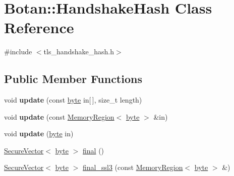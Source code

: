 \hypertarget{classBotan_1_1HandshakeHash}{\section{Botan\-:\-:Handshake\-Hash Class Reference}
\label{classBotan_1_1HandshakeHash}
}


{\ttfamily \#include $<$tls\-\_\-handshake\-\_\-hash.\-h$>$}

\subsection*{Public Member Functions}
\begin{DoxyCompactItemize}
\item 
\hypertarget{classBotan_1_1HandshakeHash_a5e5d3238dd9ef745137a117675a66faf}{void {\bfseries update} (const \hyperlink{namespaceBotan_a7d793989d801281df48c6b19616b8b84}{byte} in\mbox{[}$\,$\mbox{]}, size\-\_\-t length)}\label{classBotan_1_1HandshakeHash_a5e5d3238dd9ef745137a117675a66faf}

\item 
\hypertarget{classBotan_1_1HandshakeHash_abcfb6f6ace4b5bf418b70f7f01dcf5f9}{void {\bfseries update} (const \hyperlink{classBotan_1_1MemoryRegion}{Memory\-Region}$<$ \hyperlink{namespaceBotan_a7d793989d801281df48c6b19616b8b84}{byte} $>$ \&in)}\label{classBotan_1_1HandshakeHash_abcfb6f6ace4b5bf418b70f7f01dcf5f9}

\item 
\hypertarget{classBotan_1_1HandshakeHash_a33decdb7b373f990564562e77e29e61b}{void {\bfseries update} (\hyperlink{namespaceBotan_a7d793989d801281df48c6b19616b8b84}{byte} in)}\label{classBotan_1_1HandshakeHash_a33decdb7b373f990564562e77e29e61b}

\item 
\hyperlink{classBotan_1_1SecureVector}{Secure\-Vector}$<$ \hyperlink{namespaceBotan_a7d793989d801281df48c6b19616b8b84}{byte} $>$ \hyperlink{classBotan_1_1HandshakeHash_a32a387e9adddac3c90106495ea882eda}{final} ()
\item 
\hyperlink{classBotan_1_1SecureVector}{Secure\-Vector}$<$ \hyperlink{namespaceBotan_a7d793989d801281df48c6b19616b8b84}{byte} $>$ \hyperlink{classBotan_1_1HandshakeHash_ac9929f52d128085d06cf730c54413d63}{final\-\_\-ssl3} (const \hyperlink{classBotan_1_1MemoryRegion}{Memory\-Region}$<$ \hyperlink{namespaceBotan_a7d793989d801281df48c6b19616b8b84}{byte} $>$ \&)
\end{DoxyCompactItemize}


